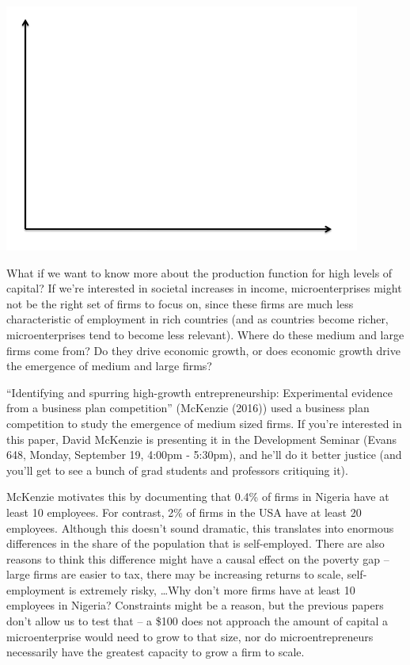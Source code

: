 \documentclass[12pt,english]{article}
\begin{document}
\begin{center}
	\begin{adjustbox}{
			max width=0.65\textwidth,
		}
		\includegraphics{axes.png}
	\end{adjustbox}
\end{center}

What if we want to know more about the production function for high levels of capital? If we're interested in societal increases in income, microenterprises might not be the right set of firms to focus on, since these firms are much less characteristic of employment in rich countries (and as countries become richer, microenterprises tend to become less relevant). Where do these medium and large firms come from? Do they drive economic growth, or does economic growth drive the emergence of medium and large firms?

``Identifying and spurring high-growth entrepreneurship: Experimental evidence from a business plan competition'' (McKenzie (2016)) used a business plan competition to study the emergence of medium sized firms. If you're interested in this paper, David McKenzie is presenting it in the Development Seminar (Evans 648, Monday, September 19, 4:00pm - 5:30pm), and he'll do it better justice (and you'll get to see a bunch of grad students and professors critiquing it).

McKenzie motivates this by documenting that 0.4\% of firms in Nigeria have at least 10 employees. For contrast, 2\% of firms in the USA have at least 20 employees. Although this doesn't sound dramatic, this translates into enormous differences in the share of the population that is self-employed. There are also reasons to think this difference might have a causal effect on the poverty gap -- large firms are easier to tax, there may be increasing returns to scale, self-employment is extremely risky, \ldots Why don't more firms have at least 10 employees in Nigeria? Constraints might be a reason, but the previous papers don't allow us to test that -- a \$100 does not approach the amount of capital a microenterprise would need to grow to that size, nor do microentrepreneurs necessarily have the greatest capacity to grow a firm to scale.
\end{document}
